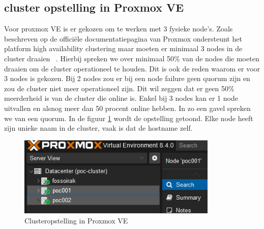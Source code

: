 


\subsection{cluster opstelling in Proxmox VE}
Voor proxmox VE is er gekozen om te werken met 3 fysieke node's. Zoals beschreven op de officiële documentatiepagina van Proxmox ondersteunt het platform high availability clustering maar moeten er minimaal 3 nodes in de cluster draaien ~\autocite{proxmoxHA}.
Hierbij spreken we over minimaal 50\% van de nodes die moeten draaien om de cluster operationeel te houden. Dit is ook de reden waarom er voor 3 nodes is gekozen.
Bij 2 nodes zou er bij een node failure geen quorum zijn en zou de cluster niet meer operationeel zijn. Dit wil zeggen dat er geen 50\% meerderheid is van de cluster die online is. Enkel bij 3 nodes kan er 1 node uitvallen en alsnog meer dan 50 procent online hebben. In zo een gavel spreken we van een quorum.
In de figuur \ref{fig:cluster-proxmox} wordt de opstelling getoond. Elke node heeft zijn unieke naam in de cluster, vaak is dat de hostname zelf.
\begin{figure}[H]
  \centering
  \includegraphics[width=0.85\textwidth]{../poc/cluster-info-prox.png}
  \caption{Clusteropstelling in Proxmox VE}
  \label{fig:cluster-proxmox}
\end{figure}
